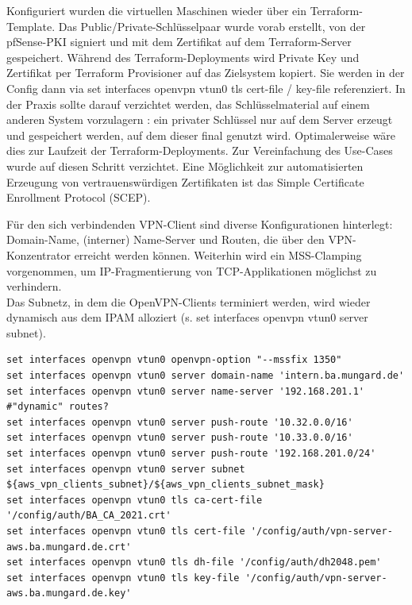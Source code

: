 Konfiguriert wurden die virtuellen Maschinen wieder über ein Terraform-Template. Das Public/Private-Schlüsselpaar wurde vorab erstellt, von der pfSense-PKI signiert und mit dem Zertifikat auf dem Terraform-Server gespeichert. Während des Terraform-Deployments wird Private Key und Zertifikat per Terraform Provisioner auf das Zielsystem kopiert. Sie werden in der Config dann via set interfaces openvpn vtun0 tls cert-file / key-file referenziert. In der Praxis sollte darauf verzichtet werden, das Schlüsselmaterial \glqq auf einem anderen System vorzulagern \grqq{}: ein privater Schlüssel nur auf dem Server erzeugt und gespeichert werden, auf dem dieser final genutzt wird. Optimalerweise wäre dies zur Laufzeit der Terraform-Deployments. Zur Vereinfachung des Use-Cases wurde auf diesen Schritt verzichtet. Eine Möglichkeit zur automatisierten Erzeugung von vertrauenswürdigen Zertifikaten ist das Simple Certificate Enrollment Protocol (SCEP)\cite[S.554]{Schmeh2013}.

Für den sich verbindenden VPN-Client sind diverse Konfigurationen hinterlegt: Domain-Name, (interner) Name-Server und Routen, die über den VPN-Konzentrator erreicht werden können.
Weiterhin wird ein MSS-Clamping vorgenommen, um IP-Fragmentierung von TCP-Applikationen möglichst zu verhindern.\\
Das Subnetz, in dem die OpenVPN-Clients terminiert werden, wird wieder dynamisch aus dem IPAM alloziert (s. set interfaces openvpn vtun0 server subnet).

\begin{lstlisting}[label=vpn-c2s-server-config,caption=Terraform Template für VyOS OpenVPN-Server in AWS]
set interfaces openvpn vtun0 openvpn-option "--mssfix 1350"
set interfaces openvpn vtun0 server domain-name 'intern.ba.mungard.de'
set interfaces openvpn vtun0 server name-server '192.168.201.1'
#"dynamic" routes?
set interfaces openvpn vtun0 server push-route '10.32.0.0/16'
set interfaces openvpn vtun0 server push-route '10.33.0.0/16'
set interfaces openvpn vtun0 server push-route '192.168.201.0/24'
set interfaces openvpn vtun0 server subnet ${aws_vpn_clients_subnet}/${aws_vpn_clients_subnet_mask}
set interfaces openvpn vtun0 tls ca-cert-file '/config/auth/BA_CA_2021.crt'
set interfaces openvpn vtun0 tls cert-file '/config/auth/vpn-server-aws.ba.mungard.de.crt'
set interfaces openvpn vtun0 tls dh-file '/config/auth/dh2048.pem'
set interfaces openvpn vtun0 tls key-file '/config/auth/vpn-server-aws.ba.mungard.de.key'
\end{lstlisting}

